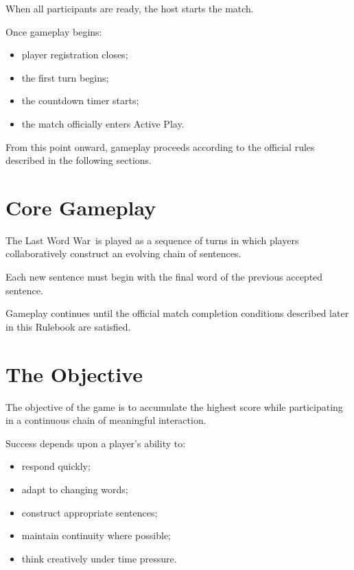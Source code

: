 \documentclass[11pt,a4paper]{article}
\begin{document}
When all participants are ready, the host starts the match.

Once gameplay begins:

\begin{itemize}
    \item player registration closes;
    \item the first turn begins;
    \item the countdown timer starts;
    \item the match officially enters Active Play.
\end{itemize}

From this point onward, gameplay proceeds according to the official rules described in the following sections.

\section{Core Gameplay}

The Last Word War\texttrademark\ is played as a sequence of turns in which players collaboratively construct an evolving chain of sentences.

Each new sentence must begin with the final word of the previous accepted sentence.

Gameplay continues until the official match completion conditions described later in this Rulebook are satisfied.

\section{The Objective}

The objective of the game is to accumulate the highest score while participating in a continuous chain of meaningful interaction.

Success depends upon a player's ability to:

\begin{itemize}
    \item respond quickly;
    \item adapt to changing words;
    \item construct appropriate sentences;
    \item maintain continuity where possible;
    \item think creatively under time pressure.
\end{itemize}
\end{document}
